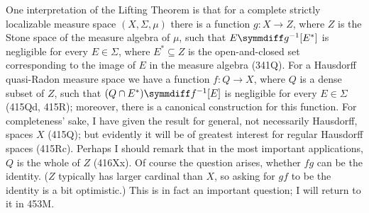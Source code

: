 {One interpretation of the Lifting Theorem is that for a complete
strictly localizable measure space $(X,\Sigma,\mu)$ there is a function
$g:X\to Z$, where $Z$ is the Stone space of the measure algebra of
$\mu$, such
that $E\symmdiff g^{-1}[E^*]$ is negligible for every $E\in\Sigma$,
where $E^*\subseteq Z$ is the open-and-closed set corresponding to the
image of $E$ in the measure algebra (341Q).   For a Hausdorff
quasi-Radon measure
space we have a function $f:Q\to X$, where $Q$ is a dense subset of $Z$,
such that $(Q\cap E^*)\symmdiff f^{-1}[E]$ is negligible for every
$E\in\Sigma$ (415Qd, 415R);  moreover, there is a canonical construction
for this function.   For completeness' sake, I have given the result for
general, not necessarily Hausdorff, spaces $X$ (415Q);  but evidently it
will be of greatest interest for regular Hausdorff spaces (415Rc).
Perhaps I should remark that in the most important applications, $Q$ is
the whole
of $Z$ (416Xx).   Of course the question arises, whether $fg$ can be
the identity.   ($Z$ typically has larger cardinal than $X$, so asking
for $gf$ to be the identity is a bit optimistic.)   This is in fact an
important question;  I will return to it in 453M.
}%

\discrpage

